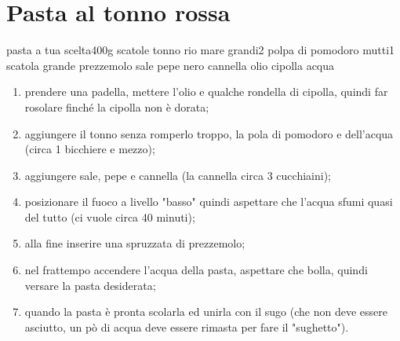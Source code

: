 \section{Pasta al tonno rossa}

\generalRecipeInfos{}

\ingredienti%
    {pasta a tua scelta}{400g}%
    {scatole tonno rio mare grandi}{2}%
    {polpa di pomodoro mutti}{1 scatola grande}%
    {prezzemolo}{\qb{}}%
    {sale}{\qb{}}%
    {pepe nero}{\qb{}}%
    {cannella}{\qb{}}%
    {olio}{\qb{}}%
    {cipolla}{\qb{}}%
    {acqua}{\qb{}}

\begin{enumerate}
    \item prendere una padella, mettere l'olio e qualche rondella di cipolla, quindi far rosolare finché la cipolla non è dorata;
    \item aggiungere il tonno senza romperlo troppo, la pola di pomodoro e dell'acqua (circa 1 bicchiere e mezzo);
    \item aggiungere sale, pepe e cannella (la cannella circa 3 cucchiaini);
    \item posizionare il fuoco a livello "basso" quindi aspettare che l'acqua sfumi quasi del tutto (ci vuole circa 40 minuti);
    \item alla fine inserire una spruzzata di prezzemolo;
    \item nel frattempo accendere l'acqua della pasta, aspettare che bolla, quindi versare la pasta desiderata;
    \item quando la pasta è pronta scolarla ed unirla con il sugo (che non deve essere asciutto, un pò di acqua deve essere rimasta per fare il "sughetto").
\end{enumerate}
    